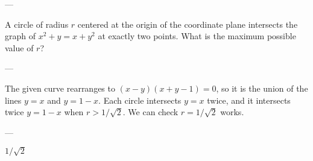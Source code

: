 
---

A circle of radius $r$ centered at the origin of the coordinate plane intersects the graph of $x^2+y=x+y^2$ at exactly two points. What is the maximum possible value of $r$?

---

The given curve rearranges to $(x-y)(x+y-1)=0$, so it is the union of the lines $y=x$ and $y=1-x$. Each circle intersects $y=x$ twice, and it intersects twice $y=1-x$ when $r>1/\sqrt2$. We can check $r=1/\sqrt2$ works.

---

$1/\sqrt2$
